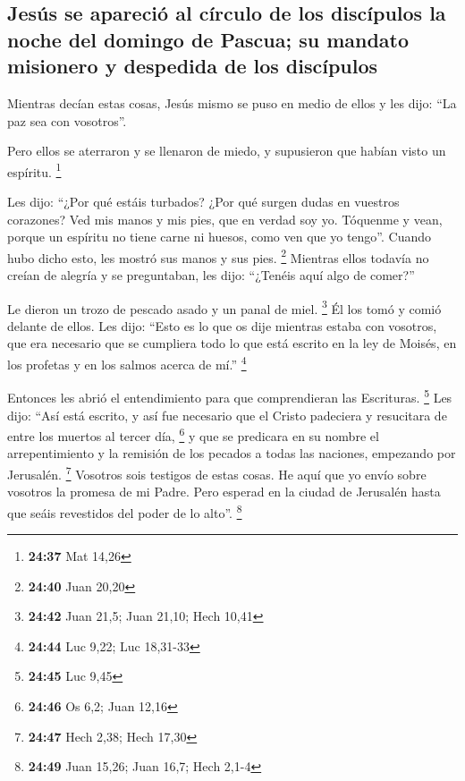 \hypertarget{jesuxfas-se-apareciuxf3-al-cuxedrculo-de-los-discuxedpulos-la-noche-del-domingo-de-pascua-su-mandato-misionero-y-despedida-de-los-discuxedpulos}{%
\subsection{Jesús se apareció al círculo de los discípulos la noche del
domingo de Pascua; su mandato misionero y despedida de los
discípulos}\label{jesuxfas-se-apareciuxf3-al-cuxedrculo-de-los-discuxedpulos-la-noche-del-domingo-de-pascua-su-mandato-misionero-y-despedida-de-los-discuxedpulos}}

 Mientras decían estas cosas, Jesús mismo se puso en
medio de ellos y les dijo: ``La paz sea con vosotros''.

 Pero ellos se aterraron y se llenaron de miedo, y
supusieron que habían visto un espíritu. \footnote{\textbf{24:37} Mat
  14,26}

 Les dijo: ``¿Por qué estáis turbados? ¿Por qué surgen
dudas en vuestros corazones?  Ved mis manos y mis pies,
que en verdad soy yo. Tóquenme y vean, porque un espíritu no tiene carne
ni huesos, como ven que yo tengo''.  Cuando hubo dicho
esto, les mostró sus manos y sus pies. \footnote{\textbf{24:40} Juan
  20,20}  Mientras ellos todavía no creían de alegría y
se preguntaban, les dijo: ``¿Tenéis aquí algo de comer?''

 Le dieron un trozo de pescado asado y un panal de miel.
\footnote{\textbf{24:42} Juan 21,5; Juan 21,10; Hech 10,41}
 Él los tomó y comió delante de ellos. 
Les dijo: ``Esto es lo que os dije mientras estaba con vosotros, que era
necesario que se cumpliera todo lo que está escrito en la ley de Moisés,
en los profetas y en los salmos acerca de mí.'' \footnote{\textbf{24:44}
  Luc 9,22; Luc 18,31-33}

 Entonces les abrió el entendimiento para que
comprendieran las Escrituras. \footnote{\textbf{24:45} Luc 9,45}
 Les dijo: ``Así está escrito, y así fue necesario que el
Cristo padeciera y resucitara de entre los muertos al tercer día,
\footnote{\textbf{24:46} Os 6,2; Juan 12,16}  y que se
predicara en su nombre el arrepentimiento y la remisión de los pecados a
todas las naciones, empezando por Jerusalén. \footnote{\textbf{24:47}
  Hech 2,38; Hech 17,30}  Vosotros sois testigos de estas
cosas.  He aquí que yo envío sobre vosotros la promesa de
mi Padre. Pero esperad en la ciudad de Jerusalén hasta que seáis
revestidos del poder de lo alto''. \footnote{\textbf{24:49} Juan 15,26;
  Juan 16,7; Hech 2,1-4}

